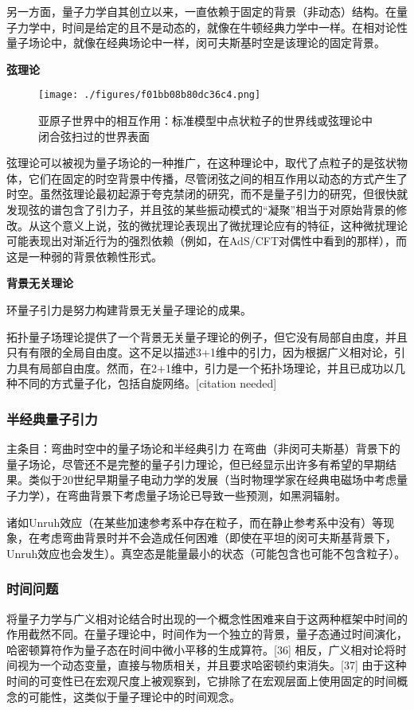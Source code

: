 另一方面，量子力学自其创立以来，一直依赖于固定的背景（非动态）结构。在量子力学中，时间是给定的且不是动态的，就像在牛顿经典力学中一样。在相对论性量子场论中，就像在经典场论中一样，闵可夫斯基时空是该理论的固定背景。

\textbf{弦理论}
\begin{figure}[ht]
\centering
\texttt{[image: ./figures/f01bb08b80dc36c4.png]}
\caption{亚原子世界中的相互作用：标准模型中点状粒子的世界线或弦理论中闭合弦扫过的世界表面} \label{fig_LZYL_4}
\end{figure}
弦理论可以被视为量子场论的一种推广，在这种理论中，取代了点粒子的是弦状物体，它们在固定的时空背景中传播，尽管闭弦之间的相互作用以动态的方式产生了时空。虽然弦理论最初起源于夸克禁闭的研究，而不是量子引力的研究，但很快就发现弦的谱包含了引力子，并且弦的某些振动模式的“凝聚”相当于对原始背景的修改。从这个意义上说，弦的微扰理论表现出了微扰理论应有的特征，这种微扰理论可能表现出对渐近行为的强烈依赖（例如，在AdS/CFT对偶性中看到的那样），而这是一种弱的背景依赖性形式。

\textbf{背景无关理论}  

环量子引力是努力构建背景无关量子理论的成果。

拓扑量子场理论提供了一个背景无关量子理论的例子，但它没有局部自由度，并且只有有限的全局自由度。这不足以描述3+1维中的引力，因为根据广义相对论，引力具有局部自由度。然而，在2+1维中，引力是一个拓扑场理论，并且已成功以几种不同的方式量子化，包括自旋网络。[citation needed]
\subsubsection{半经典量子引力}  
主条目：弯曲时空中的量子场论和半经典引力  
在弯曲（非闵可夫斯基）背景下的量子场论，尽管还不是完整的量子引力理论，但已经显示出许多有希望的早期结果。类似于20世纪早期量子电动力学的发展（当时物理学家在经典电磁场中考虑量子力学），在弯曲背景下考虑量子场论已导致一些预测，如黑洞辐射。

诸如Unruh效应（在某些加速参考系中存在粒子，而在静止参考系中没有）等现象，在考虑弯曲背景时并不会造成任何困难（即使在平坦的闵可夫斯基背景下，Unruh效应也会发生）。真空态是能量最小的状态（可能包含也可能不包含粒子）。
\subsubsection{时间问题 } 
将量子力学与广义相对论结合时出现的一个概念性困难来自于这两种框架中时间的作用截然不同。在量子理论中，时间作为一个独立的背景，量子态通过时间演化，哈密顿算符作为量子态在时间中微小平移的生成算符。[36] 相反，广义相对论将时间视为一个动态变量，直接与物质相关，并且要求哈密顿约束消失。[37] 由于这种时间的可变性已在宏观尺度上被观察到，它排除了在宏观层面上使用固定的时间概念的可能性，这类似于量子理论中的时间观念。